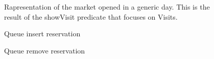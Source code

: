 \begin{figure}[H]

  \centering
  \caption{Rapresentation of the market opened in a generic day. This is the result of the showVisit predicate that focuses on Visits.}
    \label{showVisit}

    
\end{figure}


\begin{figure}[H]
  \centering
    \caption{Queue insert reservation}
      \label{addInQueue}

\end{figure}


\begin{figure}[H]
  \centering
    \caption{Queue remove reservation}
      \label{deInQueue}

\end{figure}

